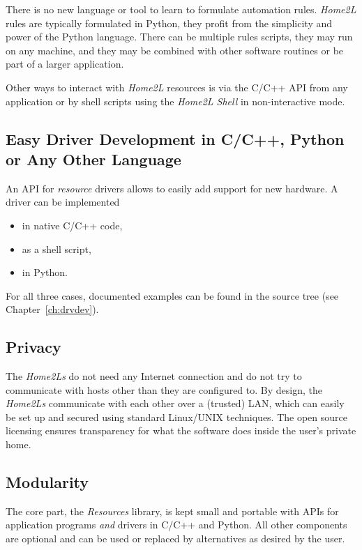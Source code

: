 \documentclass[12pt,english,parskip=half]{scrreprt}
\begin{document}
There is no new language or tool to learn to formulate automation rules.
\emph{Home2L} rules are typically formulated in Python, they profit from the
simplicity and power of the Python language.
There can be multiple rules scripts, they may run on any machine, and they may
be combined with other software routines or be part of a larger application.

Other ways to interact with \emph{Home2L} resources is via the C/C++ API from any
application or by shell scripts using the \emph{Home2L Shell} in non-interactive mode.


\subsection*{Easy Driver Development in C/C++, Python or Any Other Language}

An API for \emph{resource} drivers allows to easily add support for new hardware.
A driver can be implemented

\begin{itemize}
  \item in native C/C++ code,
  \item as a shell script,
  \item in Python.
\end{itemize}

For all three cases, documented examples can be found in the source tree
(see Chapter~\ref{ch:drvdev}).


\subsection*{Privacy}

The \emph{Home2Ls} do not need any Internet connection and do not try to communicate
with hosts other than they are configured to. By design, the \emph{Home2Ls}
communicate with each other over a (trusted) LAN, which can easily be set up
and secured using standard Linux/UNIX techniques. The open source licensing ensures
transparency for what the software does inside the user's private home.


\subsection*{Modularity}

The core part, the \emph{Resources} library, is kept small and portable with APIs
for application programs \emph{and} drivers in C/C++ and Python. All other components
are optional and can be used or replaced by alternatives as desired by the user.
\end{document}
